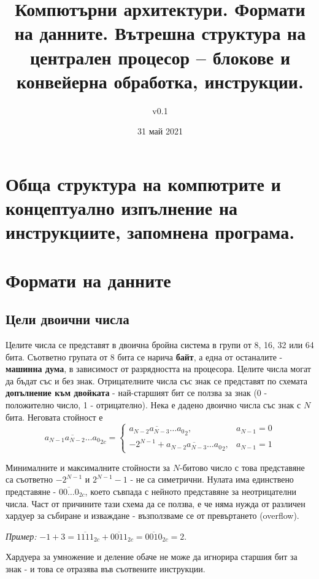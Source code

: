 \documentclass[fleqn,12pt]{article}
\title{Компютърни архитектури. Формати на данните. Вътрешна структура на централен процесор – блокове и конвейерна обработка, инструкции.}
\author{v0.1}
\date{31 май 2021}
\begin{document}
\maketitle

\tableofcontents

\section{Обща структура на компютрите и концептуално изпълнение на инструкциите,
запомнена програма.}

\section{Формати на данните}

\subsection{Цели двоични числа}
\label{subsection:integers}
Целите числа се представят в двоична бройна система в групи от 8, 16, 32 или 64 бита. Съответно групата от 8 бита се нарича \textbf{байт},
а една от останалите - \textbf{машинна дума}, в зависимост от разрядността на процесора. Целите числа могат да бъдат със и без знак.
Отрицателните числа със знак се представят по схемата \textbf{допълнение към двойката} - най-старшият бит се ползва за знак (0 - положително число, 1 - отрицателно).
Нека е дадено двоично числа със знак с $N$ бита. Неговата стойност е
\[ \overline{a_{N-1} a_{N-2} \dots a_0}_{2c} = \begin{cases}
    \overline{a_{N-2} a_{N-3} \dots a_0}_2, & a_{N-1} = 0 \\
    -2^{N-1} + \overline{a_{N-2} a_{N-3} \dots a_0}_2, & a_{N-1} = 1
\end{cases}
\]

Минималните и максималните стойности за $N$-битово число с това представяне са съответно $-2^{N-1}$ и $2^{N-1} - 1$ - не са симетрични. 
Нулата има единствено представяне - $\overline{00\dots0}_{2c}$, което съвпада с нейното представяне за неотрицателни числа.
Част от причините тази схема да се ползва, е че няма нужда от различен хардуер за събиране и изваждане - възползваме се от превъртането (overflow).

\textit{Пример: } $-1 + 3 = \overline{1111}_{2c} + \overline{0011}_{2c} = \overline{0010}_{2c} = 2$. 

Хардуера за умножение и деление обаче не може да игнорира старшия бит за знак - и това се отразява във съотвените инструкции.
\end{document}
